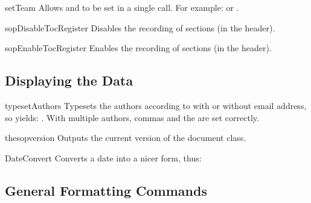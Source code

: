 \documentclass[useartcl,notoc]{sopra-paper}
\begin{document}
\begin{command}{setTeam}{}
    Allows  and  to be set in a single call.
    For example:  or
    .
\end{command}

\begin{command}{sopDisableTocRegister}{}
    Disables the recording of sections (in the header).
\end{command}

\begin{command}{sopEnableTocRegister}{}
    Enables the recording of sections (in the header).
\end{command}

\subsection{Displaying the Data}

\begin{command}{typesetAuthors}{}
    Typesets the authors according to  with or
    without email address, so  yields: \typesetAuthors.
    With multiple authors, commas and the  are set correctly.
\end{command}

\begin{command}{thesopversion}{}
    Outputs the current version of the  document class. 
\end{command}

\begin{command}{DateConvert}{}
    Converts a date into a nicer form, thus:
\begin{plainlatex}[morekeywords={[5]{\\DateConvert}}]
\end{plainlatex}
\end{command}

\subsection{General Formatting Commands}
\end{document}
